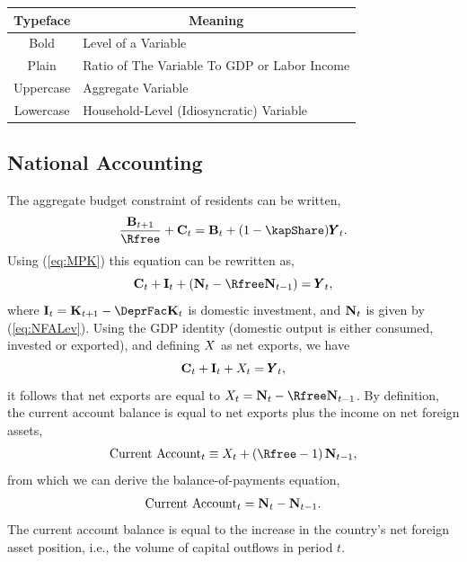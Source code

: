 \documentclass[titlepage]{\econtex}\newcommand{\texname}{cjSOE}
\renewcommand{\GDPLev}{\ensuremath{\pmb{Y}}}
\begin{document}
\begin{center}
\begin{tabular}{|c|l|} \hline
 Typeface & \multicolumn{1}{c|}{Meaning}  \\ \hline
 Bold & Level of a Variable \\
 Plain    & Ratio of The Variable To GDP or Labor Income  \\
 Uppercase & Aggregate Variable \\
 Lowercase    & Household-Level (Idiosyncratic) Variable  \\
\hline
\end{tabular}
\end{center}

\subsection{National Accounting}
\label{NatAc}

The aggregate budget constraint of residents can be written,
\begin{equation*}
\frac{\BLev_{t+1}}{\Rfree}+\CLev_t=\BLev_t+(1-\kapShare)\GDPLev_t.
\end{equation*}
Using (\ref{eq:MPK}) this equation can be rewritten as,
\begin{equation*}
\CLev_t+\ILev_t+\left(\NFALev_t-\Rfree \NFALev_{t-1} \right)=\GDPLev_t,
\end{equation*}
where $\ILev_t=\KLev_{t+1}- \DeprFac \KLev_t$ is domestic investment, and $\mathbf{N}_t$ is given by (\ref{eq:NFALev}). Using the GDP identity (domestic output is either consumed, invested or exported),
and defining $X$ as net exports, we have
\begin{equation*}
\CLev_t+\ILev_t+\XLev_t=\GDPLev_t,
\end{equation*}
it follows that net exports are equal to $\XLev_t=\NFALev_t-\Rfree \NFALev_{t-1}$. By definition, the current account balance is equal to net exports plus the income on net foreign assets,
\begin{equation*}
\text{Current Account}_t \equiv \XLev_t+\left(\Rfree-1 \right) \NFALev_{t-1},
\end{equation*}
from which we can derive the balance-of-payments equation,
\begin{equation*}
\text{Current Account}_t=\mathbf{N}_t -\mathbf{N}_{t-1}.
\end{equation*}
The current account balance is equal to the increase in the country's net foreign asset position, i.e., the volume of capital outflows in period $t$.
\end{document}

